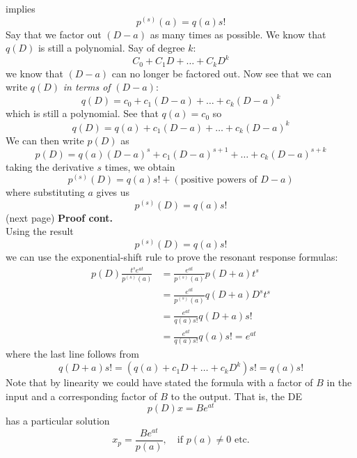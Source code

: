 \documentclass{report}
\begin{document}
implies
\begin{equation*}
p^{(s)}(a)=q(a)s!
\end{equation*}
Say that we factor out $(D-a)$ as many times as possible. We know that $q(D)$ is still a polynomial. 
Say of degree $k$:
\begin{equation*}
C_0+C_1D+\ldots+C_kD^k
\end{equation*}
we know that $(D-a)$ can no longer be factored out. Now see that we can write $q(D)$ \textit{in terms of} $(D-a)$:
\begin{equation*}
q(D)=c_0+c_1(D-a)+\ldots+c_k(D-a)^k
\end{equation*}
which is still a polynomial. See that $q(a)=c_0$ so
\begin{equation*}
q(D)=q(a)+c_1(D-a)+\ldots+c_k(D-a)^k
\end{equation*}
We can then write $p(D)$ as
\begin{equation*}
p(D)=q(a)(D-a)^s+c_1(D-a)^{s+1}+\ldots+c_k(D-a)^{s+k}
\end{equation*}
taking the derivative $s$ times, we obtain
\begin{equation*}
p^{(s)}(D)=q(a)s!+(\text{positive powers of $D-a$})
\end{equation*}
where substituting $a$ gives us
\begin{equation*}
p^{(s)}(D)=q(a)s!
\end{equation*}
(next page)
\newpage
\noindent\textbf{Proof cont.}\\
Using the result
\begin{equation*}
p^{(s)}(D)=q(a)s!
\end{equation*}
we can use the exponential-shift rule to prove the resonant response formulas:
\begin{align*}
p(D)\frac{t^se^{at}}{p^{(s)}(a)}&=\frac{e^{at}}{p^{(s)}(a)}p(D+a)t^s\\
&=\frac{e^{at}}{p^{(s)}(a)}q(D+a)D^st^s\\
&=\frac{e^{at}}{q(a)s!}q(D+a)s!\\
&=\frac{e^{at}}{q(a)s!}q(a)s!=e^{at}
\end{align*}
where the last line follows from 
\begin{equation*}
q(D+a)s!=(q(a)+c_1D+\ldots+c_kD^k)s!=q(a)s!
\end{equation*}
Note that by linearity we could have stated the formula with a factor of $B$ in the input and a 
corresponding factor of $B$ to the output. That is, the DE
\begin{equation*}
p(D)x=Be^{at}
\end{equation*}
has a particular solution
\begin{equation*}
x_p=\frac{Be^{at}}{p(a)},\quad\text{if }p(a)\neq0\text{ etc.}
\end{equation*}
\newpage
\end{document}
